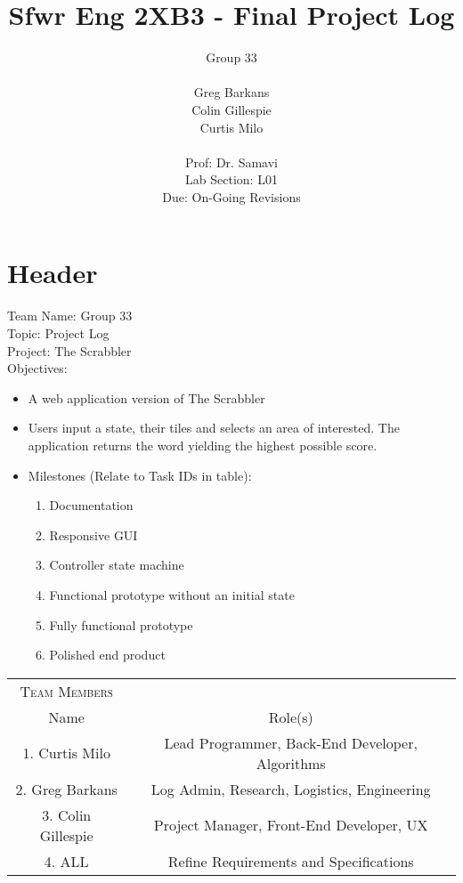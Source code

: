 \documentclass[10pt, oneside]{article}
\title{Sfwr Eng 2XB3 - Final Project Log}
\author{
	Group 33   \\ \\ 
	Greg Barkans \\
	Colin Gillespie \\
	Curtis Milo \\
	 \vspace{2cm} \\
	Prof: Dr. Samavi \\
	Lab Section: L01 \\
	Due: On-Going Revisions \\	
}
\date{}
\begin{document}
\maketitle
\newpage


\section{Header}
Team Name: Group 33 \\
Topic: Project Log \\
Project: The Scrabbler \\
Objectives:
\begin{itemize}
	\item A web application version of The Scrabbler
	\item Users input a state, their tiles and selects an area of interested.  The application returns the word yielding the highest possible score.
	\item Milestones (Relate to Task IDs in table):
	\begin{enumerate}[1]
		\item Documentation
		\item Responsive GUI
		\item Controller state machine
		\item Functional prototype without an initial state
		\item Fully functional prototype
		\item Polished end product
	\end{enumerate}
\end{itemize}

\vspace{1cm}

\begin{tabular}{|c|c|}
	\hline
	\textsc{Team Members} & \\
	Name & Role(s) \\
	\hline
	1. Curtis Milo & Lead Programmer, Back-End Developer, Algorithms  \\
	\hline
	2. Greg Barkans & Log Admin, Research, Logistics, Engineering \\
	\hline
	3. Colin Gillespie & Project Manager, Front-End Developer, UX \\
	\hline
	4. ALL & Refine Requirements and Specifications \\
	\hline
\end{tabular}
\end{document}

